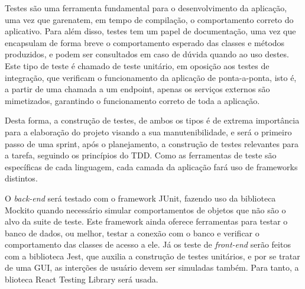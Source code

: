 Testes são uma ferramenta fundamental para o desenvolvimento da
aplicação, uma vez que garenatem, em tempo de compilação, o
comportamento correto do aplicativo. Para além disso, testes tem um
papel de documentação, uma vez que encapsulam de forma breve o
comportamento esperado das classes e métodos produzidos, e podem ser
consultados em caso de dúvida quando ao uso destes. Este tipo de teste
é chamado de teste unitário, em oposição aos testes de integração, que
verificam o funcionamento da aplicação de ponta-a-ponta, isto é, a
partir de uma chamada a um endpoint, apenas os serviços externos são
mimetizados, garantindo o funcionamento correto de toda a aplicação.

Desta forma, a construção de testes, de ambos os tipos é de extrema
importância para a elaboração do projeto visando a sua
manutenibilidade, e será o primeiro passo de uma sprint, após o
planejamento, a construção de testes relevantes para a tarefa,
seguindo os princípios do TDD. Como as ferramentas de teste são
específicas de cada linguagem, cada camada da aplicação fará uso de
frameworks distintos.

O \emph{back-end} será testado com o framework JUnit, fazendo uso da
biblioteca Mockito quando necessário simular comportamentos de objetos
que não são o alvo da suite de teste. Este framework ainda oferece
ferramentas para testar o banco de dados, ou melhor, testar a conexão
com o banco e verificar o comportamento das classes de acesso a ele.
Já os teste de \emph{front-end} serão feitos com a biblioteca Jest,
que auxilia a construção de testes unitários, e por se tratar de uma
GUI, as interções de usuário devem ser simuladas também. Para tanto, a
blioteca React Testing Library será usada.

